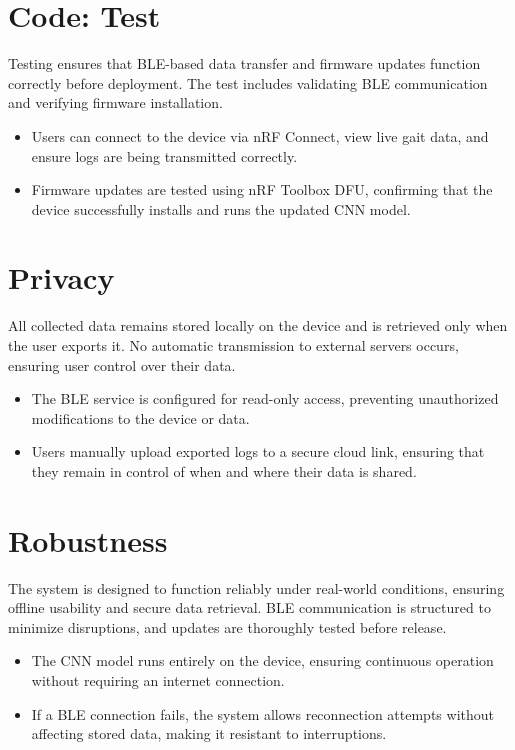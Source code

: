 \section{Code: Test}
Testing ensures that BLE-based data transfer and firmware updates function correctly before deployment. The test includes validating BLE communication and verifying firmware installation.

\begin{itemize}
	\item Users can connect to the device via nRF Connect, view live gait data, and ensure logs are being transmitted correctly.
	\item Firmware updates are tested using nRF Toolbox DFU, confirming that the device successfully installs and runs the updated CNN model.
\end{itemize}

\section{Privacy}
All collected data remains stored locally on the device and is retrieved only when the user exports it. No automatic transmission to external servers occurs, ensuring user control over their data.

\begin{itemize}
	\item The BLE service is configured for read-only access, preventing unauthorized modifications to the device or data.
	\item Users manually upload exported logs to a secure cloud link, ensuring that they remain in control of when and where their data is shared.
\end{itemize}
\section{Robustness}
The system is designed to function reliably under real-world conditions, ensuring offline usability and secure data retrieval. BLE communication is structured to minimize disruptions, and updates are thoroughly tested before release.

\begin{itemize}
	\item The CNN model runs entirely on the device, ensuring continuous operation without requiring an internet connection.
	\item If a BLE connection fails, the system allows reconnection attempts without affecting stored data, making it resistant to interruptions.
\end{itemize}


